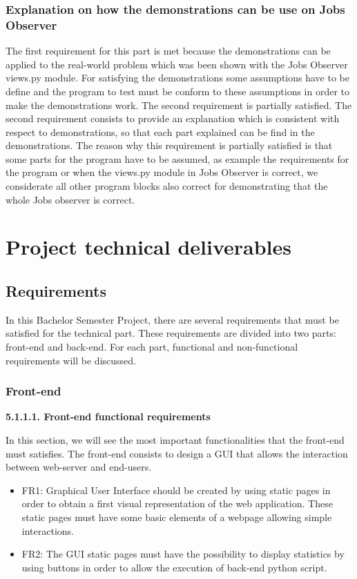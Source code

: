 \documentclass[conference,compsoc]{IEEEtran}
\begin{document}
\subsubsection{Explanation on how the demonstrations can be use on Jobs Observer}
The first requirement for this part is met because the demonstrations can be applied to the real-world problem which was been shown with the Jobs Observer views.py module. For satisfying the demonstrations some assumptions have to be define and the program to test must be conform to these assumptions in order to make the demonstrations work. 
\newline
The second requirement is partially satisfied. The second requirement consists to provide an explanation which is consistent with respect to demonstrations, so that each part explained can be find in the demonstrations. The reason why this requirement is partially satisfied is that some parts for the program have to be assumed, as example the requirements for the program or when the views.py module in Jobs Observer is correct, we considerate all other program blocks also correct for demonstrating that the whole Jobs observer is correct.  


\section{Project technical deliverables}

\label{sec-production}
\subsection{Requirements}

In this Bachelor Semester Project, there are several requirements that must be satisfied for the technical part. These requirements are divided into two parts: front-end and back-end. For each part, functional and non-functional requirements will be discussed. 
\subsubsection{Front-end}
\noindent
\newline\newline
\textbf{5.1.1.1. Front-end functional requirements}
\newline

In this section, we will see the most important functionalities that the front-end must satisfies. The front-end consists to design a GUI that allows the interaction between web-server and end-users. 
\begin{itemize}
	\item FR1: Graphical User Interface should be created by using static pages in order to obtain a first visual representation of the web application. These static pages must have some basic elements of a webpage allowing simple interactions.

\item FR2: The GUI static pages must have the possibility to display statistics by using buttons in order to allow the execution of back-end python script. 
\end{itemize}
	
\end{document}
